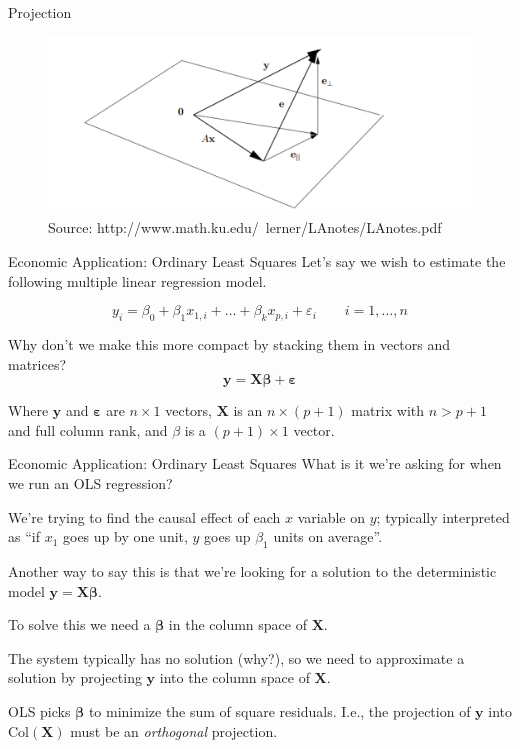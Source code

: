 \documentclass[11pt, xcolor={dvipsnames}, hyperref={colorlinks, allcolors=Blue}]{beamer}
\renewcommand{\epsilon}{\varepsilon}
\newcommand{\X}{\mathbf{X}}
\newcommand{\y}{\mathbf{y}}
\newcommand{\bepsilon}{\mathbf{\varepsilon}}
\newcommand{\bbeta}{\mathbf{\beta}}
\begin{document}
\begin{frame}{Projection}
\begin{figure}[H]
\centering
\includegraphics[width=\textwidth]{least_squares.png}
\caption{Orthogonal Projection}
\caption*{Source: http://www.math.ku.edu/~lerner/LAnotes/LAnotes.pdf}

\end{figure}
\end{frame}


\begin{frame}{Economic Application: Ordinary Least Squares}
Let's say we wish to estimate the following multiple linear regression model.

\[ y_{i} = \beta_{0} + \beta_{1}x_{1,i} + \dots + \beta_{k}x_{p,i} + \epsilon_{i} \quad \quad i = 1,\dots,n\]

\bigskip
Why don't we make this more compact by stacking them in vectors and matrices?
\[ \y = \X \bbeta + \bepsilon\]
\medskip

Where $\y$ and $\bepsilon$ are $n\times 1$ vectors, $\X$ is an $n\times (p+1)$ matrix with $n > p+1$ and full column rank, and $\beta$ is a $(p+1)\times 1$ vector.
\end{frame}

\begin{frame}{Economic Application: Ordinary Least Squares}
What is it we're asking for when we run an OLS regression?\bigskip

We're trying to find the causal effect of each $x$ variable on $y$; typically interpreted as ``if $x_1$ goes up by one unit, $y$ goes up $\beta_1$ units on average''. \bigskip

Another way to say this is that we're looking for a solution to the deterministic model $\y = \X \bbeta$. \bigskip

To solve this we need a $\bbeta$ in the column space of $\X$.\bigskip

The system typically has no solution (why?), so we need to approximate a solution by projecting $\y$ into the column space of $\X$. \bigskip

OLS picks $\bbeta$ to minimize the sum of square residuals. I.e., the projection of $\y$ into $\text{Col}(\X)$ must be an \emph{orthogonal} projection.
\end{frame}
\end{document}
